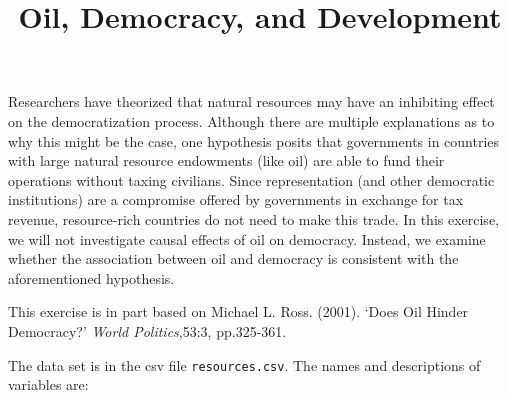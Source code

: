 \documentclass[]{article}
\title{Oil, Democracy, and Development}
\author{}
\date{}
\begin{document}
\maketitle


Researchers have theorized that natural resources may have an inhibiting
effect on the democratization process. Although there are multiple
explanations as to why this might be the case, one hypothesis posits
that governments in countries with large natural resource endowments
(like oil) are able to fund their operations without taxing civilians.
Since representation (and other democratic institutions) are a
compromise offered by governments in exchange for tax revenue,
resource-rich countries do not need to make this trade. In this
exercise, we will not investigate causal effects of oil on democracy.
Instead, we examine whether the association between oil and democracy is
consistent with the aforementioned hypothesis.

This exercise is in part based on Michael L. Ross. (2001). `Does Oil
Hinder Democracy?' \emph{World Politics},53:3, pp.325-361.

The data set is in the csv file \texttt{resources.csv}. The names and
descriptions of variables are:
\end{document}
